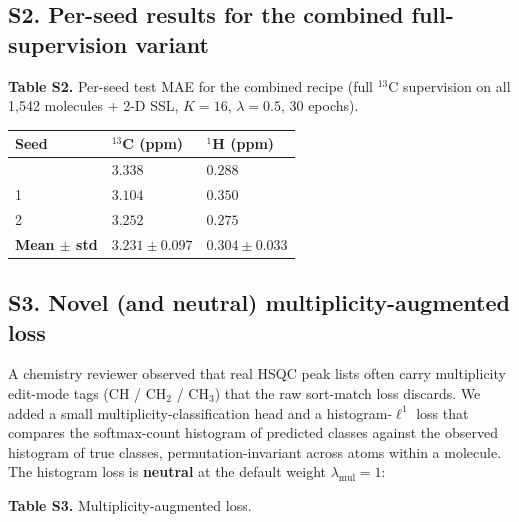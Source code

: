 \documentclass[
  11pt,
  a4paper,
]{article}
\newcounter{none} %
\begin{document}
\subsection*{S2. Per-seed results for the combined full-supervision variant}

\textbf{Table S2.} Per-seed test MAE for the combined recipe (full
\(^{13}\)C supervision on all 1,542 molecules \(+\) 2-D SSL, \(K=16\),
\(\lambda=0.5\), 30 epochs).

{\def\LTcaptype{none} %
\begin{longtable}[]{@{}lll@{}}
\toprule\noalign{}
Seed & \(^{13}\)C (ppm) & \(^{1}\)H (ppm) \\
\midrule\noalign{}
\endhead
\bottomrule\noalign{}
\endlastfoot
0 & \(3.338\) & \(0.288\) \\
1 & \(3.104\) & \(0.350\) \\
2 & \(3.252\) & \(0.275\) \\
\textbf{Mean \(\pm\) std} & \textbf{\(3.231 \pm 0.097\)} & \textbf{\(0.304 \pm 0.033\)} \\
\end{longtable}
}

\subsection*{S3. Novel (and neutral) multiplicity-augmented loss}

A chemistry reviewer observed that real HSQC peak lists often carry
multiplicity edit-mode tags (CH / CH\(_2\) / CH\(_3\)) that the raw
sort-match loss discards. We added a small multiplicity-classification
head and a histogram-\(\ell^1\) loss that compares the softmax-count
histogram of predicted classes against the observed histogram of true
classes, permutation-invariant across atoms within a molecule. The
histogram loss is \textbf{neutral} at the default weight
\(\lambda_{\text{mul}} = 1\):

\textbf{Table S3.} Multiplicity-augmented loss.
\end{document}
